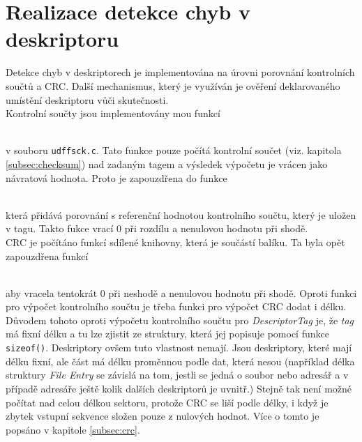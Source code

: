 \section{Realizace detekce chyb v deskriptoru}
\label{sec:realizace-detekce}
Detekce chyb v deskriptorech je implementována na úrovni porovnání kontrolních součtů a CRC. Další mechanismus, který je využíván je ověření deklarovaného umístění deskriptoru vůči skutečnosti.\\
Kontrolní součty jsou implementovány mou funkcí\\
\centerline{\texttt{}}\\
v souboru \texttt{udffsck.c}. Tato funkce pouze počítá kontrolní součet (viz. kapitola \ref{subsec:checksum}) nad zadaným tagem a výsledek výpočetu je vrácen jako návratová hodnota. Proto je zapouzdřena do funkce\\ 
\centerline{\texttt{}}\\
která přidává porovnání s referenční hodnotou kontrolního součtu, který je uložen v tagu. Takto fukce vrací 0 při rozdílu a nenulovou hodnotu při shodě.\\
CRC je počítáno funkcí sdílené knihovny, která je součástí balíku. Ta byla opět zapouzdřena funkcí\\
\centerline{\texttt{}}\\
aby vracela tentokrát 0 při neshodě a nenulovou hodnotu při shodě. Oproti funkci pro výpočet kontrolního součtu je třeba funkci pro výpočet CRC dodat i délku. Důvodem tohoto oproti výpočetu kontrolního součtu pro \textit{DescriptorTag} je, že \textit{tag} má fixní délku a tu lze zjistit ze struktury, která jej popisuje pomocí funkce \texttt{sizeof()}. Deskriptory ovšem tuto vlastnost nemají. Jsou deskriptory, které mají délku fixní, ale část má délku proměnnou podle dat, která nesou (například délka struktury \textit{File Entry} se závislá na tom, jestli se jedná o soubor nebo adresář a v případě adresáře ještě kolik dalších deskriptorů je uvnitř.) Stejně tak není možné počítat nad celou délkou sektoru, protože CRC se liší podle délky, i když je zbytek vstupní sekvence složen pouze z nulových hodnot. Více o tomto je popsáno v kapitole \ref{subsec:crc}.

